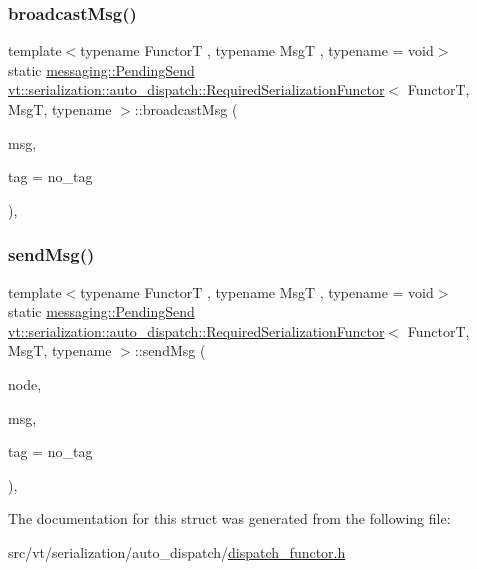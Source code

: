 \subsubsection{\texorpdfstring{broadcast\+Msg()}{broadcastMsg()}}
{\footnotesize\ttfamily template$<$typename FunctorT , typename MsgT , typename  = void$>$ \\
static \hyperlink{structvt_1_1messaging_1_1_pending_send}{messaging\+::\+Pending\+Send} \hyperlink{structvt_1_1serialization_1_1auto__dispatch_1_1_required_serialization_functor}{vt\+::serialization\+::auto\+\_\+dispatch\+::\+Required\+Serialization\+Functor}$<$ FunctorT, MsgT, typename $>$\+::broadcast\+Msg (\begin{DoxyParamCaption}\item[{MsgT $\ast$}]{msg,  }\item[{\hyperlink{namespacevt_a84ab281dae04a52a4b243d6bf62d0e52}{Tag\+Type} const \&}]{tag = {\ttfamily no\+\_\+tag} }\end{DoxyParamCaption})\hspace{0.3cm}{\ttfamily [inline]}, {\ttfamily [static]}}

\mbox{\label{structvt_1_1serialization_1_1auto__dispatch_1_1_required_serialization_functor_a6e5a4c21ff3aca953e489f51a4f3189e}} 
\subsubsection{\texorpdfstring{send\+Msg()}{sendMsg()}}
{\footnotesize\ttfamily template$<$typename FunctorT , typename MsgT , typename  = void$>$ \\
static \hyperlink{structvt_1_1messaging_1_1_pending_send}{messaging\+::\+Pending\+Send} \hyperlink{structvt_1_1serialization_1_1auto__dispatch_1_1_required_serialization_functor}{vt\+::serialization\+::auto\+\_\+dispatch\+::\+Required\+Serialization\+Functor}$<$ FunctorT, MsgT, typename $>$\+::send\+Msg (\begin{DoxyParamCaption}\item[{\hyperlink{namespacevt_a866da9d0efc19c0a1ce79e9e492f47e2}{Node\+Type} const \&}]{node,  }\item[{MsgT $\ast$}]{msg,  }\item[{\hyperlink{namespacevt_a84ab281dae04a52a4b243d6bf62d0e52}{Tag\+Type} const \&}]{tag = {\ttfamily no\+\_\+tag} }\end{DoxyParamCaption})\hspace{0.3cm}{\ttfamily [inline]}, {\ttfamily [static]}}



The documentation for this struct was generated from the following file\+:\begin{DoxyCompactItemize}
\item 
src/vt/serialization/auto\+\_\+dispatch/\hyperlink{dispatch__functor_8h}{dispatch\+\_\+functor.\+h}\end{DoxyCompactItemize}
